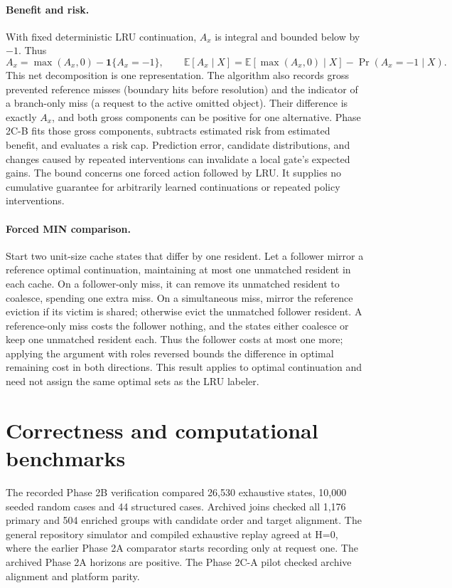 \documentclass[11pt,letterpaper]{article}
\begin{document}
\paragraph{Benefit and risk.} With fixed deterministic LRU continuation, \(A_x\) is integral and bounded below by \(-1\). Thus
\[
 A_x=\max(A_x,0)-\mathbf 1\{A_x=-1\},
 \qquad
 \mathbb{E}[A_x\mid X]=\mathbb{E}[\max(A_x,0)\mid X]-\Pr(A_x=-1\mid X).
\]
This net decomposition is one representation. The algorithm also records gross prevented reference misses (boundary hits before resolution) and the indicator of a branch-only miss (a request to the active omitted object). Their difference is exactly \(A_x\), and both gross components can be positive for one alternative. Phase 2C-B fits those gross components, subtracts estimated risk from estimated benefit, and evaluates a risk cap. Prediction error, candidate distributions, and changes caused by repeated interventions can invalidate a local gate's expected gains. The bound concerns one forced action followed by LRU. It supplies no cumulative guarantee for arbitrarily learned continuations or repeated policy interventions.

\paragraph{Forced MIN comparison.} Start two unit-size cache states that differ by one resident. Let a follower mirror a reference optimal continuation, maintaining at most one unmatched resident in each cache. On a follower-only miss, it can remove its unmatched resident to coalesce, spending one extra miss. On a simultaneous miss, mirror the reference eviction if its victim is shared; otherwise evict the unmatched follower resident. A reference-only miss costs the follower nothing, and the states either coalesce or keep one unmatched resident each. Thus the follower costs at most one more; applying the argument with roles reversed bounds the difference in optimal remaining cost in both directions. This result applies to optimal continuation and need not assign the same optimal sets as the LRU labeler.

\section{Correctness and computational benchmarks}
The recorded Phase 2B verification compared 26,530 exhaustive states, 10,000 seeded random cases and 44 structured cases. Archived joins checked all 1,176 primary and 504 enriched groups with candidate order and target alignment. The general repository simulator and compiled exhaustive replay agreed at H=0, where the earlier Phase 2A comparator starts recording only at request one. The archived Phase 2A horizons are positive. The Phase 2C-A pilot checked archive alignment and platform parity.
\end{document}
